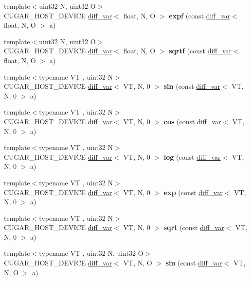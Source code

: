 \begin{DoxyCompactItemize}
\item 
{\footnotesize template$<$uint32 N, uint32 O$>$ }\\C\+U\+G\+A\+R\+\_\+\+H\+O\+S\+T\+\_\+\+D\+E\+V\+I\+CE \hyperlink{structcugar_1_1diff__var}{diff\+\_\+var}$<$ float, N, O $>$ {\bfseries expf} (const \hyperlink{structcugar_1_1diff__var}{diff\+\_\+var}$<$ float, N, O $>$ a)
\item 
{\footnotesize template$<$uint32 N, uint32 O$>$ }\\C\+U\+G\+A\+R\+\_\+\+H\+O\+S\+T\+\_\+\+D\+E\+V\+I\+CE \hyperlink{structcugar_1_1diff__var}{diff\+\_\+var}$<$ float, N, O $>$ {\bfseries sqrtf} (const \hyperlink{structcugar_1_1diff__var}{diff\+\_\+var}$<$ float, N, O $>$ a)
\item 
{\footnotesize template$<$typename VT , uint32 N$>$ }\\C\+U\+G\+A\+R\+\_\+\+H\+O\+S\+T\+\_\+\+D\+E\+V\+I\+CE \hyperlink{structcugar_1_1diff__var}{diff\+\_\+var}$<$ VT, N, 0 $>$ {\bfseries sin} (const \hyperlink{structcugar_1_1diff__var}{diff\+\_\+var}$<$ VT, N, 0 $>$ a)
\item 
{\footnotesize template$<$typename VT , uint32 N$>$ }\\C\+U\+G\+A\+R\+\_\+\+H\+O\+S\+T\+\_\+\+D\+E\+V\+I\+CE \hyperlink{structcugar_1_1diff__var}{diff\+\_\+var}$<$ VT, N, 0 $>$ {\bfseries cos} (const \hyperlink{structcugar_1_1diff__var}{diff\+\_\+var}$<$ VT, N, 0 $>$ a)
\item 
{\footnotesize template$<$typename VT , uint32 N$>$ }\\C\+U\+G\+A\+R\+\_\+\+H\+O\+S\+T\+\_\+\+D\+E\+V\+I\+CE \hyperlink{structcugar_1_1diff__var}{diff\+\_\+var}$<$ VT, N, 0 $>$ {\bfseries log} (const \hyperlink{structcugar_1_1diff__var}{diff\+\_\+var}$<$ VT, N, 0 $>$ a)
\item 
{\footnotesize template$<$typename VT , uint32 N$>$ }\\C\+U\+G\+A\+R\+\_\+\+H\+O\+S\+T\+\_\+\+D\+E\+V\+I\+CE \hyperlink{structcugar_1_1diff__var}{diff\+\_\+var}$<$ VT, N, 0 $>$ {\bfseries exp} (const \hyperlink{structcugar_1_1diff__var}{diff\+\_\+var}$<$ VT, N, 0 $>$ a)
\item 
{\footnotesize template$<$typename VT , uint32 N$>$ }\\C\+U\+G\+A\+R\+\_\+\+H\+O\+S\+T\+\_\+\+D\+E\+V\+I\+CE \hyperlink{structcugar_1_1diff__var}{diff\+\_\+var}$<$ VT, N, 0 $>$ {\bfseries sqrt} (const \hyperlink{structcugar_1_1diff__var}{diff\+\_\+var}$<$ VT, N, 0 $>$ a)
\item 
{\footnotesize template$<$typename VT , uint32 N, uint32 O$>$ }\\C\+U\+G\+A\+R\+\_\+\+H\+O\+S\+T\+\_\+\+D\+E\+V\+I\+CE \hyperlink{structcugar_1_1diff__var}{diff\+\_\+var}$<$ VT, N, O $>$ {\bfseries sin} (const \hyperlink{structcugar_1_1diff__var}{diff\+\_\+var}$<$ VT, N, O $>$ a)

\end{DoxyCompactItemize}
